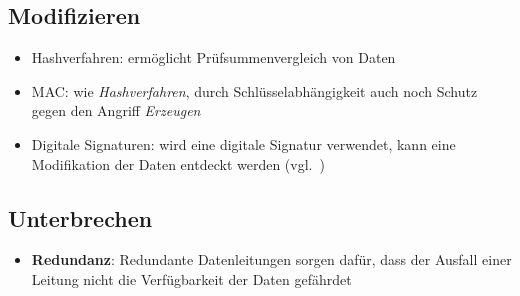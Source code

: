 \subsection*{Modifizieren}
\begin{itemize}
    \itemsep0.5em
    \item {Hashverfahren}: ermöglicht Prüfsummenvergleich von Daten
    \item {MAC}: wie \textit{Hashverfahren}, durch Schlüsselabhängigkeit auch noch Schutz gegen den Angriff \textit{Erzeugen}
    \item {Digitale Signaturen}: wird eine digitale Signatur verwendet, kann eine Modifikation der Daten entdeckt werden (vgl.~\cite[382]{Eck18})
\end{itemize}


\subsection*{Unterbrechen}
\begin{itemize}
    \itemsep0.5em
    \item \textbf{Redundanz}: Redundante Datenleitungen sorgen dafür, dass der Ausfall einer Leitung nicht die Verfügbarkeit der Daten gefährdet
\end{itemize}

